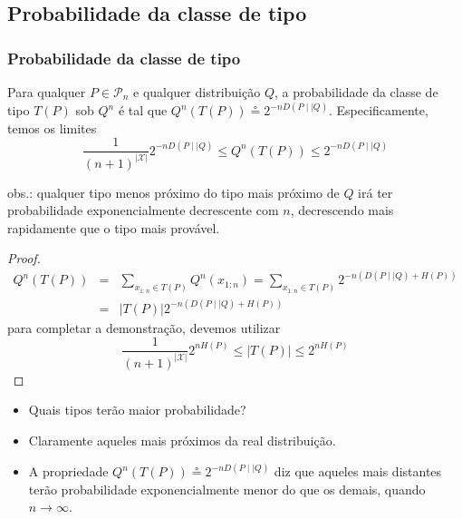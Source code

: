 \subsection{Probabilidade da classe de tipo}
\begin{frame}[allowframebreaks]
  \frametitle{Probabilidade da classe de tipo}
   \begin{theorem}
   Para qualquer $P \in \mathcal{P}_n$ e qualquer distribuição $Q$, a probabilidade da classe de tipo
   $T(P)$ sob $Q^n$ é tal que $Q^n(T(P)) \circeq 2^{-n D(P \mid \mid Q)}$. Especificamente, temos os limites
   \begin{equation}
   \frac{1}{(n+1)^{\vert \mathcal{X} \vert}} 2^{-n D(P \mid \mid Q)} \leq Q^n(T(P)) \leq 2^{-nD(P \mid \mid Q)}
   \end{equation}
   \end{theorem}
   obs.: qualquer tipo menos próximo do tipo mais próximo de $Q$ irá ter probabilidade exponencialmente decrescente com $n$, 
   decrescendo mais rapidamente que o tipo mais provável.
   \framebreak
   \begin{proof}
   \begin{eqnarray}
   Q^n(T(P)) &=& \sum_{x_{1:n} \in T(P)} Q^n(x_{1:n}) = \sum_{x_{1:n} \in T(P)} 2^{-n (D(P \mid \mid Q) + H(P))} \nonumber \\
	&=& \vert T(P) \vert 2^{-n (D(P \mid \mid Q) + H(P))}
   \end{eqnarray}
   para completar a demonstração, devemos utilizar 
        \begin{equation}
        \frac{1}{(n+1)^{\vert \mathcal{X} \vert}} 2^{nH(P)} \leq \vert T(P) \vert \leq 2^{nH(P)}
        \end{equation}
   \end{proof}

   \framebreak

   \begin{itemize}
   \item Quais tipos terão maior probabilidade?
   \item Claramente aqueles mais próximos da real distribuição.
   \item A propriedade $Q^n(T(P)) \circeq 2^{-n D(P \mid \mid Q)}$ diz que aqueles
	mais distantes terão probabilidade exponencialmente menor do que os demais, quando $n \rightarrow \infty$.
   \end{itemize}

\end{frame}


